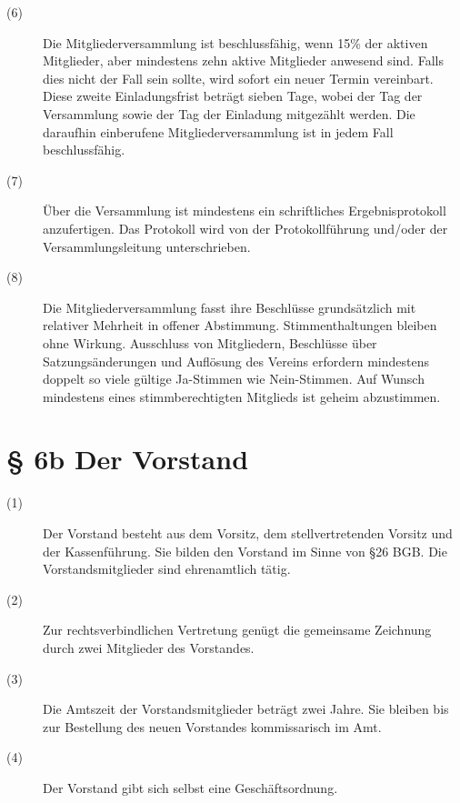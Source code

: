 \documentclass[a4paper,12pt]{scrartcl}
\begin{document}
\begin{description}
\item[(6)] Die Mitgliederversammlung ist beschlussfähig, wenn 15\% der aktiven Mitglieder, aber mindestens zehn aktive Mitglieder anwesend sind. Falls dies nicht der Fall sein sollte, wird sofort ein neuer Termin vereinbart. Diese zweite Einladungsfrist beträgt sieben Tage, wobei der Tag der Versammlung sowie der Tag der Einladung mitgezählt werden. Die daraufhin einberufene Mitgliederversammlung ist in jedem Fall beschlussfähig.
\item[(7)] Über die Versammlung ist mindestens ein schriftliches Ergebnisprotokoll anzufertigen. Das Protokoll wird von der Protokollführung und/oder der Versammlungsleitung unterschrieben.
\item[(8)] Die Mitgliederversammlung fasst ihre Beschlüsse grundsätzlich mit relativer Mehrheit in offener Abstimmung. Stimmenthaltungen bleiben ohne Wirkung. Ausschluss von Mitgliedern, Beschlüsse über Satzungsänderungen und Auflösung des Vereins erfordern mindestens doppelt so viele gültige Ja-Stimmen wie Nein-Stimmen. Auf Wunsch mindestens eines stimmberechtigten Mitglieds ist geheim abzustimmen.

\end{description}



\section*{\S{} 6b Der Vorstand}
\begin{description} 

\item[(1)] Der Vorstand besteht aus dem Vorsitz, dem stellvertretenden Vorsitz und der Kassenführung. Sie bilden den Vorstand im Sinne von §26 BGB. Die Vorstandsmitglieder sind ehrenamtlich tätig.
\item[(2)] Zur rechtsverbindlichen Vertretung genügt die gemeinsame Zeichnung durch zwei Mitglieder des Vorstandes.
\item[(3)] Die Amtszeit der Vorstandsmitglieder beträgt zwei Jahre. Sie bleiben bis zur Bestellung des neuen Vorstandes kommissarisch im Amt.
\item[(4)] Der Vorstand gibt sich selbst eine Geschäftsordnung.

\end{description}
\end{document}
